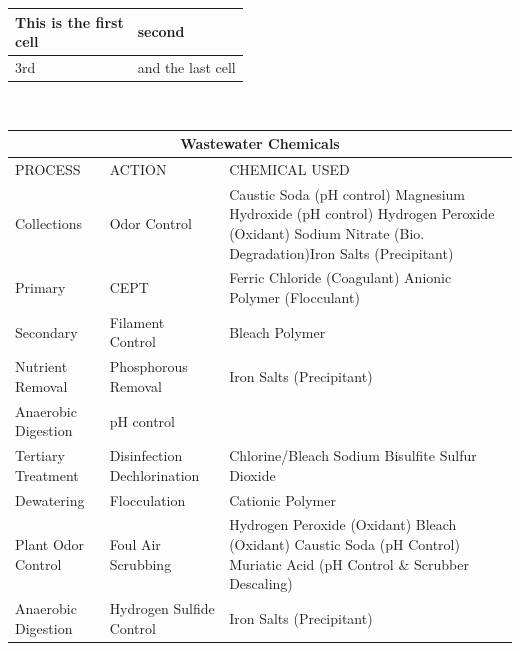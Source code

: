 \documentclass{article}
\begin{document}

\begin{tabular}{|l|l|} \hline
    \pbox{20cm}{This is the first \\ cell} & second \\ \hline
    3rd & and the last cell \\ \hline
\end{tabular}\\

\setlength{\arrayrulewidth}{1mm}
\setlength{\tabcolsep}{8 pt}
\renewcommand{\arraystretch}{0.7}

{
\begin{tabular}{ |p{4cm}|p{4.5cm}|p{6.5cm}|  }
\hline
\multicolumn{3}{|c|}{\textbf{Wastewater Chemicals}} \\
\hline

\hspace{1 cm}PROCESS & \hspace{0.8 cm} ACTION & \hspace{1.2 cm} CHEMICAL USED \\
\hline
Collections & Odor Control & Caustic Soda (pH control) \newline Magnesium Hydroxide (pH control) \newline Hydrogen Peroxide (Oxidant) \newline Sodium Nitrate (Bio. Degradation)\newline Iron Salts (Precipitant)\\
Primary & CEPT & Ferric Chloride (Coagulant) \newline Anionic Polymer (Flocculant) \\
Secondary    &Filament Control & Bleach \newline Polymer \\
Nutrient Removal & Phosphorous Removal & Iron Salts (Precipitant) \\
Anaerobic Digestion & pH control & \\
Tertiary Treatment & Disinfection  \newline Dechlorination & Chlorine/Bleach \newline Sodium Bisulfite  \newline Sulfur Dioxide   \\
Dewatering & Flocculation & Cationic Polymer \\
Plant Odor Control & Foul Air Scrubbing & Hydrogen Peroxide (Oxidant) \newline Bleach (Oxidant) \newline Caustic Soda (pH Control) \newline Muriatic Acid (pH Control \& Scrubber Descaling)\\
\hline
Anaerobic Digestion & Hydrogen Sulfide Control & Iron Salts (Precipitant) \\
\hline
\end{tabular}
}\\
\end{document}

